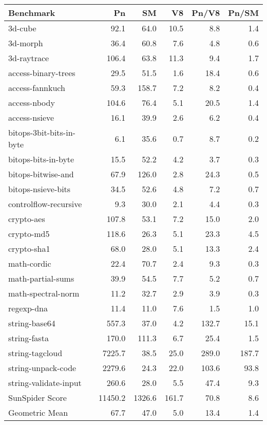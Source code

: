 \begin{tabular}{|l|r|r|r|r|r|}
  \hline
  Benchmark & Pn & SM & V8 & Pn/V8 & Pn/SM \\
  \hline \hline
  3d-cube & 92.1 & 64.0 & 10.5 & 8.8 & 1.4\\
  \hline
  3d-morph & 36.4 & 60.8 & 7.6 & 4.8 & 0.6\\
  \hline
  3d-raytrace & 106.4 & 63.8 & 11.3 & 9.4 & 1.7\\
  \hline
  access-binary-trees & 29.5 & 51.5 & 1.6 & 18.4 & 0.6\\
  \hline
  access-fannkuch & 59.3 & 158.7 & 7.2 & 8.2 & 0.4\\
  \hline
  access-nbody & 104.6 & 76.4 & 5.1 & 20.5 & 1.4\\
  \hline
  access-nsieve & 16.1 & 39.9 & 2.6 & 6.2 & 0.4\\
  \hline
  bitops-3bit-bits-in-byte & 6.1 & 35.6 & 0.7 & 8.7 & 0.2\\
  \hline
  bitops-bits-in-byte & 15.5 & 52.2 & 4.2 & 3.7 & 0.3\\
  \hline
  bitops-bitwise-and & 67.9 & 126.0 & 2.8 & 24.3 & 0.5\\
  \hline
  bitops-nsieve-bits & 34.5 & 52.6 & 4.8 & 7.2 & 0.7\\
  \hline
  controlflow-recursive & 9.3 & 30.0 & 2.1 & 4.4 & 0.3\\
  \hline
  crypto-aes & 107.8 & 53.1 & 7.2 & 15.0 & 2.0\\
  \hline
  crypto-md5 & 118.6 & 26.3 & 5.1 & 23.3 & 4.5\\
  \hline
  crypto-sha1 & 68.0 & 28.0 & 5.1 & 13.3 & 2.4\\
  \hline
  math-cordic & 22.4 & 70.7 & 2.4 & 9.3 & 0.3\\
  \hline
  math-partial-sums & 39.9 & 54.5 & 7.7 & 5.2 & 0.7\\
  \hline
  math-spectral-norm & 11.2 & 32.7 & 2.9 & 3.9 & 0.3\\
  \hline
  regexp-dna & 11.4 & 11.0 & 7.6 & 1.5 & 1.0\\
  \hline
  string-base64 & 557.3 & 37.0 & 4.2 & 132.7 & 15.1\\
  \hline
  string-fasta & 170.0 & 111.3 & 6.7 & 25.4 & 1.5\\
  \hline
  string-tagcloud & 7225.7 & 38.5 & 25.0 & 289.0 & 187.7\\
  \hline
  string-unpack-code & 2279.6 & 24.3 & 22.0 & 103.6 & 93.8\\
  \hline
  string-validate-input & 260.6 & 28.0 & 5.5 & 47.4 & 9.3\\
  \hline
  \hline
  SunSpider Score & 11450.2 & 1326.6 & 161.7 & 70.8 & 8.6\\
  Geometric Mean & 67.7 & 47.0 & 5.0 & 13.4 & 1.4\\
  \hline
\end{tabular}
